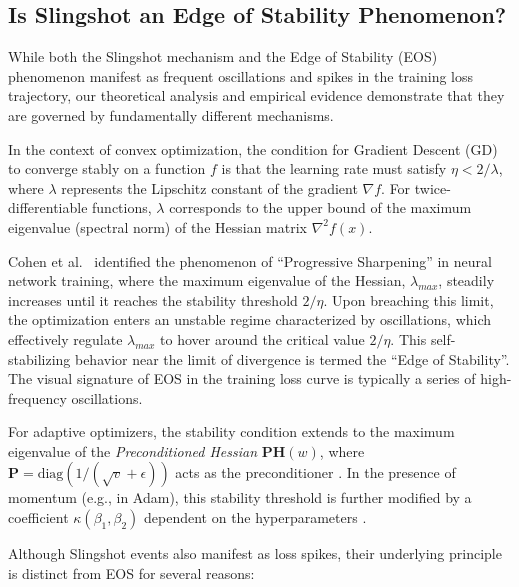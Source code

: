\documentclass{article}
\theoremstyle{plain}
\theoremstyle{definition}
\theoremstyle{remark}
\begin{document}
\subsection{Is Slingshot an Edge of Stability Phenomenon?}
\label{app:eos}

While both the Slingshot mechanism and the Edge of Stability (EOS) phenomenon manifest as frequent oscillations and spikes in the training loss trajectory, 
our theoretical analysis and empirical evidence demonstrate that they are governed by fundamentally different mechanisms.

In the context of convex optimization, 
the condition for Gradient Descent (GD) to converge stably on a function $f$ is that the learning rate must satisfy $\eta < 2/\lambda$, 
where $\lambda$ represents the Lipschitz constant of the gradient $\nabla f$. 
For twice-differentiable functions, $\lambda$ corresponds to the upper bound of the maximum eigenvalue (spectral norm) of the Hessian matrix $\nabla^2 f(x)$.

Cohen et al.~\cite{cohen2021} identified the phenomenon of ``Progressive Sharpening'' in neural network training, 
where the maximum eigenvalue of the Hessian, $\lambda_{max}$, 
steadily increases until it reaches the stability threshold $2/\eta$. 
Upon breaching this limit, the optimization enters an unstable regime characterized by oscillations, 
which effectively regulate $\lambda_{max}$ to hover around the critical value $2/\eta$. 
This self-stabilizing behavior near the limit of divergence is termed the ``Edge of Stability''. 
The visual signature of EOS in the training loss curve is typically a series of high-frequency oscillations.

For adaptive optimizers, the stability condition extends to the maximum eigenvalue of the \textit{Preconditioned Hessian} $\mathbf{P}\mathbf{H}(w)$, 
where $\mathbf{P} = \text{diag}(1/(\sqrt{v} + \epsilon))$ acts as the preconditioner \cite{cohen2023, cohen2025}. 
In the presence of momentum (e.g., in Adam), this stability threshold is further modified by 
a coefficient $\kappa(\beta_1, \beta_2)$ dependent on the hyperparameters \cite{cohen2023, bai2025}.

Although Slingshot events also manifest as loss spikes, their underlying principle is distinct from EOS for several reasons:
\end{document}
